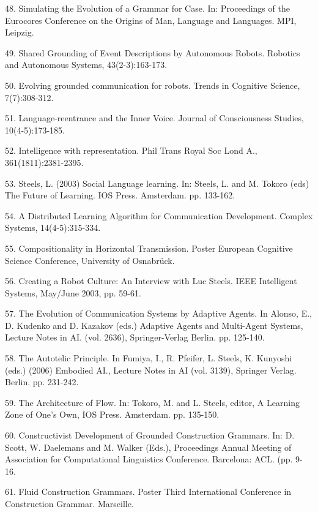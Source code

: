 48. \citet{Steels:02f} Simulating the Evolution of a Grammar for Case. In: Proceedings of the Eurocores Conference 
on the Origins of Man, Language and Languages. MPI, Leipzig.

49. \citet{Steels:03a} Shared Grounding of Event Descriptions by Autonomous Robots. 
Robotics and Autonomous Systems, 43(2-3):163-173.

50. \citet{steels:03b} Evolving grounded communication for robots. Trends in Cognitive Science, 7(7):308-312. 

51. \citet{Steels:03c} Language-reentrance and the Inner Voice. Journal of Consciousness Studies, 10(4-5):173-185. 

52. \citet{Steels:03d} Intelligence with representation. Phil Trans Royal Soc Lond A., 361(1811):2381-2395.

53. \citet{Steels:03e} Steels, L. (2003) Social Language learning. In: Steels, L. and M. Tokoro (eds) The Future of Learning. 
IOS Press. Amsterdam. pp. 133-162. 

54. \citet{dejong:03f} A Distributed Learning Algorithm for Communication Development. 
Complex Systems, 14(4-5):315-334. 

55. \citet{Neubauer:03g}  Compositionality in Horizontal Transmission.  Poster European Cognitive Science Conference, 
University of Osnabrück. 

56. \citet{Manuel:03h} Creating a Robot Culture: An Interview with Luc Steels. IEEE Intelligent Systems, May/June 2003, pp. 59-61. 

57. \citet{steels:04a} The Evolution of Communication Systems by Adaptive Agents. In Alonso, E., D. Kudenko and D. Kazakov (eds.) Adaptive Agents and Multi-Agent Systems, Lecture Notes in AI. (vol. 2636), Springer-Verlag Berlin. pp. 125-140. 

58. \citet{Steels:04b} The Autotelic Principle. In Fumiya, I., R. Pfeifer, L. Steels, K. Kunyoshi (eds.) (2006) Embodied AI., Lecture Notes in AI (vol. 3139), Springer Verlag. Berlin. pp. 231-242. 

59. \citet{Steels:04c} The Architecture of Flow. In: Tokoro, M. and L. Steels, editor, A Learning Zone of One's Own, IOS Press. Amsterdam. 
pp. 135-150.

60. \citet{Steels:04d} Constructivist Development of Grounded Construction Grammars. In: D. Scott, W. Daelemans and M. Walker (Eds.), 
Proceedings Annual Meeting of Association for Computational Linguistics Conference. Barcelona: ACL. (pp. 9-16. 

61. \citet{Steels:04e} Fluid Construction Grammars. Poster Third International Conference in Construction Grammar. Marseille.  

